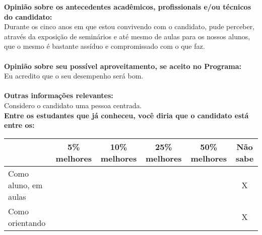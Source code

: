 \documentclass[11pt]{article}
\begin{document}
\textbf{Opinião sobre os antecedentes acadêmicos, profissionais e/ou técnicos do candidato:}
\\Durante os cinco anos em que estou convivendo com o candidato, pude perceber, através da exposição de seminários e até mesmo de aulas para os nossos alunos, que o mesmo é bastante assíduo e compromissado com o que faz. \\
\\
\textbf{Opinião sobre seu possível aproveitamento, se aceito no Programa:}
\\Eu acredito que o seu desempenho será bom.\\ 
\\
\textbf{Outras informações relevantes:} \\Considero o candidato  uma pessoa centrada. 
\\[0.3cm]
\textbf{Entre os estudantes que já conheceu, você diria que o candidato está entre os:}
\\
\begin{tabular}{|l|c|c|c|c|c|}
\hline
 & 5\% melhores & 10\% melhores & 25\% melhores & 50\% melhores & Não sabe \\
\hline
Como aluno, em aulas &  &  &  &  & X\\
\hline
Como orientando &  &  &  &  & X\\
\hline
\end{tabular}
\end{document}
